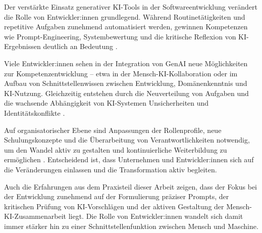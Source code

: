 
Der verstärkte Einsatz generativer KI-Tools in der Softwareentwicklung
verändert die Rolle von Entwickler:innen grundlegend. Während
Routinetätigkeiten und repetitive Aufgaben zunehmend automatisiert werden,
gewinnen Kompetenzen wie Prompt-Engineering, Systembewertung und die kritische
Reflexion von KI-Ergebnissen deutlich an Bedeutung
\cite{schmitt_generative_2024}.

Viele Entwickler:innen sehen in der Integration von GenAI neue Möglichkeiten
zur Kompetenzentwicklung – etwa in der Mensch-KI-Kollaboration oder im Aufbau
von Schnittstellenwissen zwischen Entwicklung, Domänenkenntnis und KI-Nutzung.
Gleichzeitig entstehen durch die Neuverteilung von Aufgaben und die wachsende
Abhängigkeit von KI-Systemen Unsicherheiten und Identitätskonflikte
\cite{schmitt_generative_2024}.

Auf organisatorischer Ebene sind Anpassungen der Rollenprofile, neue
Schulungskonzepte und die Überarbeitung von Verantwortlichkeiten notwendig, um
den Wandel aktiv zu gestalten und kontinuierliche Weiterbildung zu ermöglichen
\cite{nguyen-duc_generative_2023}. Entscheidend ist, dass Unternehmen und
Entwickler:innen sich auf die Veränderungen einlassen und die Transformation
aktiv begleiten.

Auch die Erfahrungen aus dem Praxisteil dieser Arbeit zeigen, dass der Fokus
bei der Entwicklung zunehmend auf der Formulierung präziser Prompts, der
kritischen Prüfung von KI-Vorschlägen und der aktiven Gestaltung der
Mensch-KI-Zusammenarbeit liegt. Die Rolle von Entwickler:innen wandelt sich
damit immer stärker hin zu einer Schnittstellenfunktion zwischen Mensch und
Maschine.
